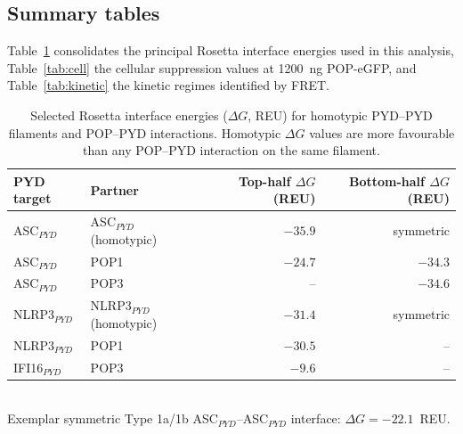 \documentclass[11pt]{article}
\begin{document}
\subsection{Summary tables}

Table~\ref{tab:rosetta} consolidates the principal Rosetta interface
energies used in this analysis, Table~\ref{tab:cell} the cellular
suppression values at 1200~ng POP-eGFP, and Table~\ref{tab:kinetic} the
kinetic regimes identified by FRET.

\begin{table}[htbp]
\centering
\caption{Selected Rosetta interface energies ($\Delta G$, REU) for
homotypic PYD--PYD filaments and POP--PYD interactions. Homotypic
$\Delta G$ values are more favourable than any POP--PYD interaction on
the same filament.}
\label{tab:rosetta}
\begin{tabular}{llrr}
\toprule
PYD target & Partner & Top-half $\Delta G$ (REU) & Bottom-half
$\Delta G$ (REU) \\
\midrule
ASC$_{PYD}$   & ASC$_{PYD}$ (homotypic)   & $-35.9$ & symmetric \\
ASC$_{PYD}$   & POP1                      & $-24.7$ & $-34.3$ \\
ASC$_{PYD}$   & POP3                      & --      & $-34.6$ \\
NLRP3$_{PYD}$ & NLRP3$_{PYD}$ (homotypic) & $-31.4$ & symmetric \\
NLRP3$_{PYD}$ & POP1                      & $-30.5$ & -- \\
IFI16$_{PYD}$ & POP3                      & $-9.6$  & -- \\
\bottomrule
\end{tabular}
\vspace{0.4em}
\\ Exemplar symmetric Type 1a/1b ASC$_{PYD}$--ASC$_{PYD}$ interface: $\Delta G = -22.1$~REU.
\end{table}
\end{document}
